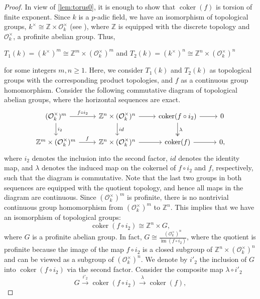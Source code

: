 \documentclass[12pt]{amsart}
\theoremstyle{remark}
\renewcommand{\1}{{\mathbb{S}}}
\newcommand{\<}{\langle}
\renewcommand{\>}{\rangle}
\newcommand{\cok}{{\operatorname{coker}}}
\begin{document}
\begin{proof}
 In view of \autoref{lem:torus0}, it is enough to show that  $\cok(f)$ is torsion of finite exponent. Since $k$ is a $p$-adic field, we have an isomorphism of topological groups, $k^{\times} \cong \mathbb{Z} \times \mathcal{O}_{k}^{\times}$ (see \cite[Proposition II. 5.7]{Neu}), where $\mathbb{Z}$ is equipped with the discrete topology and $\mathcal{O}_{k}^{\times}$, a profinite abelian group. Thus,
\begin{center}
    $T_1(k) =  (k^{\times})^{m} \cong \mathbb{Z}^{m} \times (\mathcal{O}_{k}^{\times})^{m}$ and $T_2(k) = (k^{\times})^{n} \cong  \mathbb{Z}^{n} \times (\mathcal{O}_{k}^{\times})^{n}$
\end{center} 
  for some integers $m, n \geq 1$. Here, we consider $T_1(k)$ and $T_2(k)$ as topological groups with the corresponding product topologies, and $f$ as a continuous group homomorphism. Consider the following commutative diagram of topological abelian groups, where the horizontal sequences are exact.
 \[
 \begin{tikzcd}
(\mathcal{O}_{k}^{\times})^{m}   \arrow[r, "f \circ   i_{2}"] \arrow[d, "i_{2}"] & \mathbb{Z}^{n} \times (\mathcal{O}_{k}^{\times})^{n}  \arrow[r] \arrow[d, "id"] & \cok(f \circ i_{2}) \arrow[r] \arrow[d, two heads, "\lambda"] & 0 \\
 	\mathbb{Z}^{m} \times (\mathcal{O}_{k}^{\times})^{m} \arrow[r, "f"]                 &  \mathbb{Z}^{n} \times (\mathcal{O}_{k}^{\times})^{n} \arrow[r]                & \cok(f) \arrow[r]                & 0,
 \end{tikzcd}
 \]
where $i_{2}$ denotes the inclusion into the second factor, $id$ denotes the identity map,  and $\lambda$ denotes the induced map on the cokernel of $f \circ i_{2}$ and $f$, respectively, such that the diagram is commutative. Note that the last two groups in both sequences are equipped with the quotient topology, and hence all maps in the diagram are continuous. Since $(\mathcal{O}_{k}^{\times})^{m}$ is profinite, there is no nontrivial continuous group homomorphism from $(\mathcal{O}_{k}^{\times})^{m}$ to $\mathbb{Z}^{n}$. This implies that we have an isomorphism of topological groups:
\[
\cok(f \circ i_{2}) \cong \mathbb{Z}^{n} \times G,
\]
where $G$ is a profinite abelian group. In fact,  $G \cong \frac{(\mathcal{O}_{k}^{\times})^{n}}{\operatorname{im}(f \circ i_{2})}$, where the quotient is profinite because the image of the map $f \circ i_{2}$ is a closed subgroup of  $ \mathbb{Z}^{n} \times  (\mathcal{O}_{k}^{\times})^{n}$ and can be viewed as a subgroup of $(\mathcal{O}_{k}^{\times})^{n}$.  We denote by $i'_{2}$ the inclusion of $G$ into  $ \cok(f \circ i_{2})$ via the second factor.
Consider the composite map $\lambda \circ i'_{2}$
\[
G \xrightarrow{i'_{2}} \cok(f \circ i_{2}) \xrightarrow{\lambda} \cok(f),
\]


\end{proof}
\end{document}

